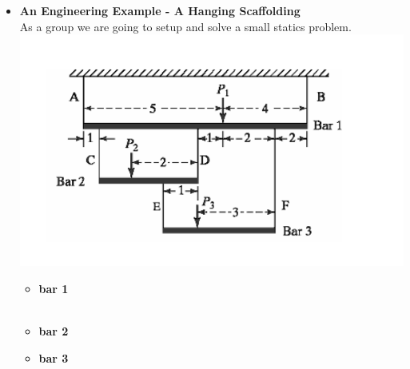 \documentclass[11pt]{article}
\begin{document}
\begin{itemize}
%		 
%	
%
%		
%
\item \textbf{\LARGE An Engineering Example - A Hanging Scaffolding}\\	
		
		As a group we are going to setup and solve a small statics problem. \\
		\includegraphics[scale=.75]{lecture2_fig1.png}\\
		{\Large
		\begin{itemize}
		 \item \textbf{bar 1} 	\\\\
		 \newpage
		  \item \textbf{bar 2}	\\ \vspace{80 mm}
		   \item \textbf{bar 3} 	\\\\
		\end{itemize} }
\newpage


\end{itemize}
\end{document}
